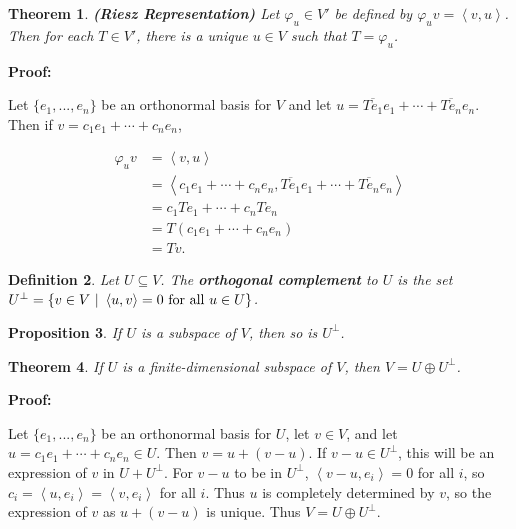 \documentclass{article}
\theoremstyle{colontheorem}
\newtheorem{theorem}{Theorem}[section]
\newtheorem{proposition}[theorem]{Proposition}
\newtheorem{definition}[theorem]{Definition}
\newenvironment{Theorem}
{
	\begin{mdframed}[backgroundcolor=TheoremOrange!10]
	\begin{theorem}
}
{
	\end{theorem}
	\end{mdframed}
	
	\vspace{.15in}
}
\newenvironment{Proposition}
{
	\begin{mdframed}[backgroundcolor=TheoremOrange!10]
	\begin{proposition}
}
{
	\end{proposition}
	\end{mdframed}
	
	\vspace{.15in}
}
\newenvironment{Def}
{
	\begin{mdframed}[backgroundcolor=DefGreen!10]
	\begin{definition}
}
{
	\end{definition}
	\end{mdframed}
	
	\vspace{.15in}
}
\newenvironment{Proof}
{
	\vspace{-.3in}
	
	\begin{mdframed}[backgroundcolor=ProofPurple!10]
	\textbf{Proof:}%
}
{
	\end{mdframed}
	
	\vspace{.15in}
}
\begin{document}
\begin{Theorem}
	
	\textbf{(Riesz Representation)} Let $\varphi_u \in V'$ be defined by $\varphi_u v = \left< v, u \right>$. Then for each $T \in V'$, there is a unique $u \in V$ such that $T = \varphi_u$.
	
\end{Theorem}



\begin{Proof}
	Let $\{e_1, ..., e_n\}$ be an orthonormal basis for $V$ and let $u = \overline{Te_1}e_1 + \cdots + \overline{Te_n}e_n$. Then if $v = c_1 e_1 + \cdots + c_n e_n$,
	
	\begin{align*}
		\varphi_u v &= \left< v, u \right>\\
		&= \left< c_1 e_1 + \cdots + c_n e_n, \overline{Te_1}e_1 + \cdots + \overline{Te_n}e_n \right>\\
		&= c_1 T e_1 + \cdots + c_n T e_n\\
		&= T(c_1 e_1 + \cdots + c_n e_n)\\
		&= Tv.
	\end{align*}
	
\end{Proof}



\begin{Def}
	
	Let $U \subseteq V$. The \textbf{orthogonal complement} to $U$ is the set $U^\perp = \{v \in V\ |\ \left< u, v \right> = 0\ \textnormal{for all}\ u \in U\}$.
	
\end{Def}



\begin{Proposition}
	
	If $U$ is a subspace of $V$, then so is $U^\perp$.
	
\end{Proposition}



\begin{Theorem}
	
	If $U$ is a finite-dimensional subspace of $V$, then $V = U \oplus U^\perp$.
	
\end{Theorem}



\begin{Proof}
	Let $\{e_1, ..., e_n\}$ be an orthonormal basis for $U$, let $v \in V$, and let $u = c_1 e_1 + \cdots + c_n e_n \in U$. Then $v = u + (v - u)$. If $v - u \in U^\perp$, this will be an expression of $v$ in $U + U^\perp$. For $v - u$ to be in $U^\perp$, $\left< v-u, e_i \right> = 0$ for all $i$, so $c_i = \left< u, e_i \right> = \left< v, e_i \right>$ for all $i$. Thus $u$ is completely determined by $v$, so the expression of $v$ as $u + (v - u)$ is unique. Thus $V = U \oplus U^\perp$.
	
\end{Proof}
\end{document}
